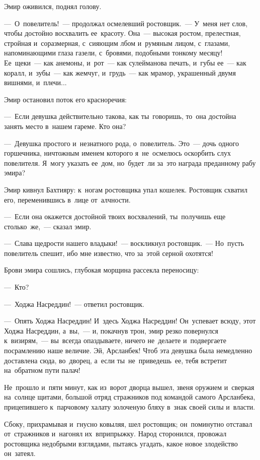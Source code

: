 \documentclass[12pt,a4paper]{book}
\begin{document}
Эмир оживился, поднял голову.

—~О~повелитель!~— продолжал осмелевший ростовщик.~— У~меня нет слов, чтобы достойно восхвалить ее~красоту. Она~— высокая ростом, прелестная, стройная и~соразмерная, с~сияющим лбом и~румяным лицом, с~глазами, напоминающими глаза газели, с~бровями, подобными тонкому месяцу! Ее~щеки~— как анемоны, и~рот~— как сулейманова печать, и~губы ее~— как коралл, и~зубы~— как жемчуг, и~грудь~— как мрамор, украшенный двумя вишнями, и~плечи...

Эмир остановил поток его красноречия:

—~Если девушка действительно такова, как ты~говоришь, то~она достойна занять место в~нашем гареме. Кто она?

—~Девушка простого и~незнатного рода, о~повелитель. Это~— дочь одного горшечника, ничтожным именем которого я~не~осмелюсь оскорбить слух повелителя. Я~могу указать ее~дом, но~будет~ли за~это награда преданному рабу эмира?

Эмир кивнул Бахтияру: к~ногам ростовщика упал кошелек. Ростовщик схватил его, переменившись в~лице от~алчности.

—~Если она окажется достойной твоих восхвалений, ты~получишь еще столько~же,~— сказал эмир.

—~Слава щедрости нашего владыки!~— воскликнул ростовщик.~— Но~пусть повелитель спешит, ибо мне известно, что за~этой серной охотятся!

Брови эмира сошлись, глубокая морщина рассекла переносицу:

—~Кто?

—~Ходжа Насреддин!~— ответил ростовщик.

—~Опять Ходжа Насреддин! И~здесь Ходжа Насреддин! Он~успевает всюду, этот Ходжа Насреддин, а~вы,~— и, покачнув трон, эмир резко повернулся к~визирям,~— вы~всегда опаздываете, ничего не~делаете и~подвергаете посрамлению наше величие. Эй, Арсланбек! Чтоб эта девушка была немедленно доставлена сюда, во~дворец, а~если ты~не~приведешь~ее, тебя встретит на~обратном пути палач!

Не~прошло и~пяти минут, как из~ворот дворца вышел, звеня оружием и~сверкая на~солнце щитами, большой отряд стражников под командой самого Арсланбека, прицепившего к~парчовому халату золоченую бляху в~знак своей силы и~власти.

Сбоку, прихрамывая и~гнусно ковыляя, шел ростовщик; он~поминутно отставал от~стражников и~нагонял их~вприпрыжку. Народ сторонился, провожал ростовщика недобрыми взглядами, пытаясь угадать, какое новое злодейство он~затеял.
\end{document}
